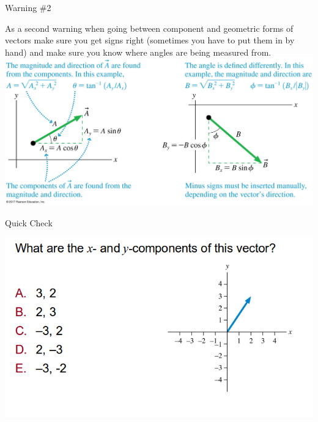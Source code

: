 \documentclass{beamer}
\newcommand{\red}[1]{{\color{red}{#1}}}
\newcommand{\checkL}[2]{\begin{textblock*}{1cm}(#1,#2){\Large \red{\Checkmark}}\end{textblock*}}
\begin{document}
\begin{frame}{Warning \#2}
\begin{center}
   As a second warning when going between component and geometric forms of vectors make sure you get signs right (sometimes you have to put them in by hand) and make sure you know where angles are being measured from. \\
   \includegraphics[width=\textwidth]{../figures/03_12_Figure.jpg}
\end{center}
\end{frame}

\begin{frame}{Quick Check}
\begin{center}
   \includegraphics[width=\textwidth]{../figures/QC3_3.png}
\end{center}
\only<2->{\checkL{1.0cm}{3.8cm}}
\end{frame}
\end{document}
